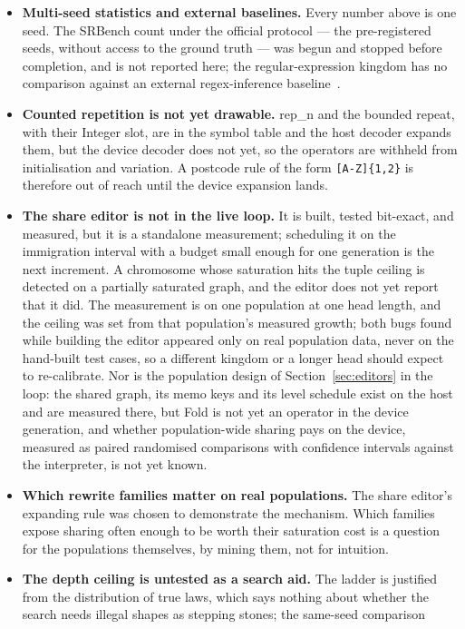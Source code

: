 \documentclass[sigconf,nonacm]{acmart}
\newcommand{\ty}[1]{\textsf{#1}}
\begin{document}
\begin{itemize}
\item \textbf{Multi-seed statistics and external baselines.} Every number above
is one seed. The SRBench count under the official protocol --- the
pre-registered seeds, without access to the ground truth --- was begun and
stopped before completion, and is not reported here; the regular-expression
kingdom has no comparison against an external regex-inference
baseline~\cite{bartoli2016regex}.
\item \textbf{Counted repetition is not yet drawable.} \ty{rep\_n} and the
bounded repeat, with their \ty{Integer} slot, are in the symbol table and the host
decoder expands them, but the device decoder does not yet, so the operators are
withheld from initialisation and variation. A postcode rule of the form
\texttt{[A-Z]\{1,2\}} is therefore out of reach until the device expansion lands.
\item \textbf{The share editor is not in the live loop.} It is built, tested
bit-exact, and measured, but it is a standalone measurement; scheduling it on
the immigration interval with a budget small enough for one generation is the
next increment. A chromosome whose saturation hits the tuple ceiling is detected on a
partially saturated graph, and the editor does not yet report that it did. The
measurement is on one population at one head length, and the ceiling was set
from that population's measured growth; both bugs found while building the
editor appeared only on real population data, never on the hand-built test
cases, so a different kingdom or a longer head should expect to re-calibrate.
Nor is the population design of Section~\ref{sec:editors} in the loop: the
shared graph, its memo keys and its level schedule exist on the host and are
measured there, but Fold is not yet an operator in the device generation, and
whether population-wide sharing pays on the device, measured as paired
randomised comparisons with confidence intervals against the interpreter, is
not yet known.
\item \textbf{Which rewrite families matter on real populations.} The share
editor's expanding rule was chosen to demonstrate the mechanism. Which families
expose sharing often enough to be worth their saturation cost is a question for
the populations themselves, by mining them, not for intuition.
\item \textbf{The depth ceiling is untested as a search aid.} The ladder is
justified from the distribution of true laws, which says nothing about whether
the search needs illegal shapes as stepping stones; the same-seed comparison

\end{itemize}
\end{document}
